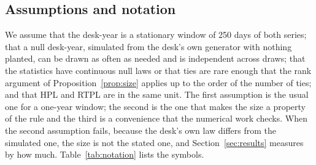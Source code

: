 \subsection{Assumptions and notation}
\label{sec:problem-assumptions}

We assume that the desk-year is a stationary window of 250 days of both series; that a null desk-year, simulated from the desk's own generator with nothing planted, can be drawn as often as needed and is independent across draws; that the statistics have continuous null laws or that ties are rare enough that the rank argument of Proposition~\ref{prop:size} applies up to the order of the number of ties; and that HPL and RTPL are in the same unit.
The first assumption is the usual one for a one-year window; the second is the one that makes the size a property of the rule and the third is a convenience that the numerical work checks.
When the second assumption fails, because the desk's own law differs from the simulated one, the size is not the stated one, and Section~\ref{sec:results} measures by how much.
Table~\ref{tab:notation} lists the symbols.

